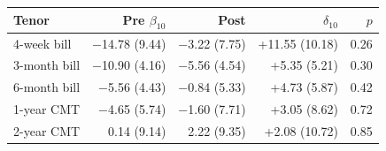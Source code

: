 \begin{tabular}{lrrrr}
\toprule
Tenor & Pre $\beta_{10}$ & Post & $\delta_{10}$ & $p$ \\
\midrule
4-week bill & \ensuremath{-}14.78 (9.44) & \ensuremath{-}3.22 (7.75) & +11.55 (10.18) & 0.26 \\
3-month bill & \ensuremath{-}10.90 (4.16) & \ensuremath{-}5.56 (4.54) & +5.35 (5.21) & 0.30 \\
6-month bill & \ensuremath{-}5.56 (4.43) & \ensuremath{-}0.84 (5.33) & +4.73 (5.87) & 0.42 \\
1-year CMT & \ensuremath{-}4.65 (5.74) & \ensuremath{-}1.60 (7.71) & +3.05 (8.62) & 0.72 \\
2-year CMT & 0.14 (9.14) & 2.22 (9.35) & +2.08 (10.72) & 0.85 \\
\bottomrule
\end{tabular}
